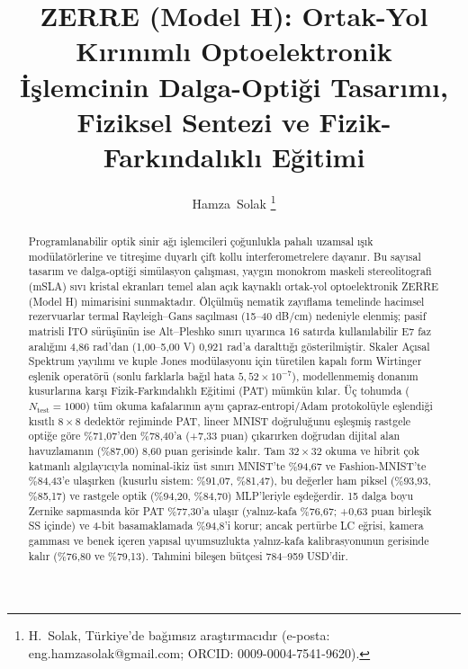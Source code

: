 \documentclass[journal]{IEEEtran}
\title{ZERRE (Model H): Ortak-Yol K\i{}r\i{}n\i{}ml\i{} Optoelektronik \.{I}\c{s}lemcinin Dalga-Opti\u{g}i Tasar\i{}m\i{}, Fiziksel Sentezi ve Fizik-Fark\i{}ndal\i{}kl\i{} E\u{g}itimi}
\author{Hamza~Solak%
\thanks{H.~Solak, T\"urkiye'de ba\u{g}\i{}ms\i{}z ara\c{s}t\i{}rmac\i{}d\i{}r (e-posta: eng.hamzasolak@gmail.com; ORCID: 0009-0004-7541-9620).}}
\begin{document}
\maketitle

\begin{abstract}
Programlanabilir optik sinir a\u{g}\i{} i\c{s}lemcileri \c{c}o\u{g}unlukla pahal\i{} uzamsal \i{}\c{s}\i{}k mod\"ulat\"orlerine ve titre\c{s}ime duyarl\i{} \c{c}ift kollu interferometrelere dayan\i{}r. Bu say\i{}sal tasar\i{}m ve dalga-opti\u{g}i sim\"ulasyon \c{c}al\i{}\c{s}mas\i{}, yayg\i{}n monokrom maskeli stereolitografi (mSLA) s\i{}v\i{} kristal ekranlar\i{} temel alan a\c{c}\i{}k kaynakl\i{} ortak-yol optoelektronik ZERRE (Model H) mimarisini sunmaktad\i{}r. \"Ol\c{c}\"ulm\"u\c{s} nematik zay\i{}flama temelinde hacimsel rezervuarlar termal Rayleigh--Gans sa\c{c}\i{}lmas\i{} (15--40 dB/cm) nedeniyle elenmi\c{s}; pasif matrisli ITO s\"ur\"u\c{s}\"un\"un ise Alt--Pleshko s\i{}n\i{}r\i{} uyar\i{}nca 16 sat\i{}rda kullan\i{}labilir E7 faz aral\i{}\u{g}\i{}n\i{} 4,86 rad'dan (1,00--5,00 V) 0,921 rad'a daraltt\i{}\u{g}\i{} g\"osterilmi\c{s}tir. Skaler A\c{c}\i{}sal Spektrum yay\i{}l\i{}m\i{} ve kuple Jones mod\"ulasyonu i\c{c}in t\"uretilen kapal\i{} form Wirtinger e\c{s}lenik operat\"or\"u (sonlu farklarla ba\u{g}\i{}l hata $5{,}52\times 10^{-7}$), modellenmemi\c{s} donan\i{}m kusurlar\i{}na kar\c{s}\i{} Fizik-Fark\i{}ndal\i{}kl\i{} E\u{g}itimi (PAT) m\"umk\"un k\i{}lar. \"U\c{c} tohumda ($N_{\mathrm{test}}=1000$) t\"um okuma kafalar\i{}n\i{}n ayn\i{} \c{c}apraz-entropi/Adam protokol\"uyle e\c{s}lendi\u{g}i k\i{}s\i{}tl\i{} $8\times 8$ dedekt\"or rejiminde PAT, lineer MNIST do\u{g}rulu\u{g}unu e\c{s}le\c{s}mi\c{s} rastgele opti\u{g}e g\"ore \%71,07'den \%78,40'a (+7,33 puan) \c{c}\i{}kar\i{}rken do\u{g}rudan dijital alan havuzlaman\i{}n (\%87,00) 8,60 puan gerisinde kal\i{}r. Tam $32\times 32$ okuma ve hibrit \c{c}ok katmanl\i{} alg\i{}lay\i{}c\i{}yla nominal-ikiz \"ust s\i{}n\i{}r\i{} MNIST'te \%94,67 ve Fashion-MNIST'te \%84,43'e ula\c{s}\i{}rken (kusurlu sistem: \%91,07, \%81,47), bu de\u{g}erler ham piksel (\%93,93, \%85,17) ve rastgele optik (\%94,20, \%84,70) MLP'leriyle e\c{s}de\u{g}erdir. 15 dalga boyu Zernike sapmas\i{}nda k\"or PAT \%77,30'a ula\c{s}\i{}r (yaln\i{}z-kafa \%76,67; +0,63 puan birle\c{s}ik SS i\c{c}inde) ve 4-bit basamaklamada \%94,8'i korur; ancak pert\"urbe LC e\u{g}risi, kamera gammas\i{} ve benek i\c{c}eren yap\i{}sal uyumsuzlukta yaln\i{}z-kafa kalibrasyonunun gerisinde kal\i{}r (\%76,80 ve \%79,13). Tahmini bile\c{s}en b\"ut\c{c}esi 784--959 USD'dir.
\end{abstract}
\end{document}
